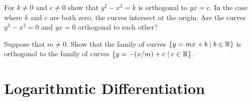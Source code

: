 \begin{exercises}
\begin{exercise} For $k\not= 0$ and $c \neq 0$ show that $y^2 -x^2 =k$ is orthogonal to
$yx =c$. In the case where $k$ and $c$ are both zero, the curves
  intersect at the origin. Are the curves $y^2 -x^2 =0$ and $yx=0$
  orthogonal to each other?
\end{exercise}

\begin{exercise} Suppose that $m\neq 0$. Show that the family of curves
$\{y=mx+b \mid b\in \mathbb{R} \}$ is orthogonal to the
family of curves $\{y=-(x/m)+c \mid c \in \mathbb{R}\}$.
\end{exercise}

\end{exercises}





















\section{Logarithmtic Differentiation}


















